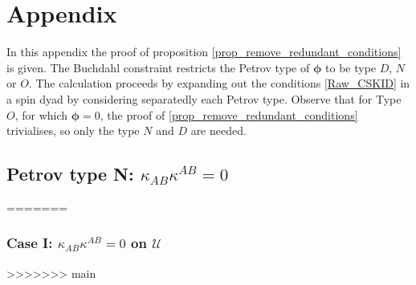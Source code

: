 \documentclass[10pt,a4paper]{article}
\theoremstyle{plain}
\begin{document}
\appendix

\section{Appendix}\label{Appendix_A}
In this appendix the proof of proposition
\ref{prop_remove_redundant_conditions} is given.
The Buchdahl constraint restricts the Petrov type of
$\bm\phi$ to be type $D$, $N$ or $O$.
The calculation proceeds by expanding out the
conditions \eqref{Raw_CSKID} in a spin dyad
by considering separatedly each Petrov type.
Observe that for Type $O$, for which $\bm\phi=0$,
the proof of \ref{prop_remove_redundant_conditions} trivialises,
so only the type $N$ and $D$ are needed.

\subsection{Petrov type N: $\kappa_{AB}\kappa^{AB}=0$}
=======
\subsubsection{Case I: $\kappa_{AB}\kappa^{AB}=0$ on $\mathcal{U}$}
>>>>>>> main
\end{document}
